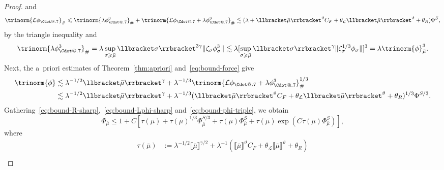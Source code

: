 \documentclass{article}
\makeatletter
\numberwithin{equation}{section}
\newcommand{\assign}{:=}
\newcommand*\Cdot{{\mathpalette\Cdot@{.7}}}
\newcommand*\Cdot@[2]{\mathbin{\vcenter{\hbox{\scalebox{#2}{\hspace{0.1mm}$\m@th#1\bullet$\hspace{0.1mm}}}}}}
\theoremstyle{plain}
\theoremstyle{definition}
\makeatother
\begin{document}
\begin{proof}
  and
  \begin{equation}
    \trinorm{ \mathcal{L} \phi_{\Cdot} }_{\#} \leqslant
    \trinorm{ \lambda \phi^3_{\Cdot} }_{\#} + \trinorm{
    \mathcal{L} \phi_{\Cdot} + \lambda \phi^3_{\Cdot} }_{\#}
    \lesssim (\lambda + \llbracket \bar{\mu} \rrbracket^{\vartheta} C_F +
    \theta_{\mathcal{L}} \llbracket \bar{\mu} \rrbracket^{\vartheta} +
    \theta_R) \Phi^S, \label{eq:bound-Lphi-sharp}
  \end{equation}
  by the triangle inequality and
  \[ \trinorm{ \lambda \phi^3_{\Cdot} }_{\#} = \lambda
     \sup_{\sigma \geqslant \bar{\mu}} \llbracket \sigma \rrbracket^{3 \gamma}
     \| \zeta_{\sigma} \phi_{\sigma}^3 \| \lesssim \lambda [\sup_{\sigma
     \geqslant \bar{\mu}} \llbracket \sigma \rrbracket^{\gamma}  \|
     \zeta_{\sigma}^{1 / 3} \phi_{\sigma} \|]^3 = \lambda \trinorm{ \phi
     }_{\bar{\mu}}^3 . \]
  Next, the a~priori estimates of Theorem~\ref{thm:apriori}
  and~\eqref{eq:bound-force} give
  \begin{equation}
    \begin{aligned}
      \trinorm{ \phi } & \lesssim \lambda^{- 1 / 2}  \llbracket
      \bar{\mu} \rrbracket^{\gamma} + \lambda^{- 1 / 3} 
      \trinorm{ \mathcal{L} \phi_{\Cdot} + \lambda \phi^3_{\Cdot}
      }_{\#}^{1 / 3}\\
      & \lesssim \lambda^{- 1 / 2}  \llbracket \bar{\mu}
      \rrbracket^{\gamma} + \lambda^{- 1 / 3}
      ( \llbracket \bar{\mu} \rrbracket^{\vartheta} C_F +
      \theta_{\mathcal{L}} \llbracket \bar{\mu} \rrbracket^{\vartheta} +
      \theta_R)^{1 / 3} \Phi^{S / 3} .
    \end{aligned} \label{eq:bound-phi-triple}
  \end{equation}
  Gathering~\eqref{eq:bound-R-sharp},~\eqref{eq:bound-Lphi-sharp}
  and~\eqref{eq:bound-phi-triple}, we obtain
  \begin{equation}
    \Phi_{\bar{\mu}} \leqslant 1 + C [\tau (\bar{\mu}) + \tau (\bar{\mu})^{1 /
    3} \Phi_{\bar{\mu}}^{S / 3} + \tau (\bar{\mu}) \Phi_{\bar{\mu}}^S + \tau
    (\bar{\mu}) \exp (C \tau (\bar{\mu}) \Phi_{\bar{\mu}}^S)],
    \label{eq:bound-Phi}
  \end{equation}
  where
  \[ \begin{aligned}
       \tau (\bar{\mu}) & \assign  \lambda^{- 1 / 2}  \llbracket \bar{\mu}
       \rrbracket^{\gamma / 2} + \lambda^{- 1} ( \llbracket
       \bar{\mu} \rrbracket^{\vartheta} C_F + \theta_{\mathcal{L}} \llbracket
       \bar{\mu} \rrbracket^{\vartheta} + \theta_R)\\

\end{aligned}\]
\end{proof}
\end{document}
